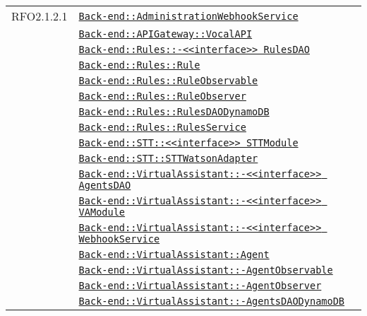 \begin{longtable}{|>{\centering}m{3cm}|m{10cm}<{\centering}|}
RFO2.1.2.1 & \hyperref[Back-end::AdministrationWebhookService]{\texttt{Back-end::AdministrationWebhookService}}\\
& \hyperref[Back-end::APIGateway::VocalAPI]{\texttt{Back-end::APIGateway::VocalAPI}}\\
& \hyperref[Back-end::Rules::<<interface>> RulesDAO]{\texttt{Back-end::Rules::-\linebreak <<interface>> RulesDAO}}\\
& \hyperref[Back-end::Rules::Rule]{\texttt{Back-end::Rules::Rule}}\\
& \hyperref[Back-end::Rules::RuleObservable]{\texttt{Back-end::Rules::RuleObservable}}\\
& \hyperref[Back-end::Rules::RuleObserver]{\texttt{Back-end::Rules::RuleObserver}}\\
& \hyperref[Back-end::Rules::RulesDAODynamoDB]{\texttt{Back-end::Rules::RulesDAODynamoDB}}\\
& \hyperref[Back-end::Rules::RulesService]{\texttt{Back-end::Rules::RulesService}}\\
& \hyperref[Back-end::STT::<<interface>> STTModule]{\texttt{Back-end::STT::<<interface>> STTModule}}\\
& \hyperref[Back-end::STT::STTWatsonAdapter]{\texttt{Back-end::STT::STTWatsonAdapter}}\\
& \hyperref[Back-end::VirtualAssistant::<<interface>> AgentsDAO]{\texttt{Back-end::VirtualAssistant::-\linebreak <<interface>> AgentsDAO}}\\
& \hyperref[Back-end::VirtualAssistant::<<interface>> VAModule]{\texttt{Back-end::VirtualAssistant::-\linebreak <<interface>> VAModule}}\\
& \hyperref[Back-end::VirtualAssistant::<<interface>> WebhookService]{\texttt{Back-end::VirtualAssistant::-\linebreak <<interface>> WebhookService}}\\
& \hyperref[Back-end::VirtualAssistant::Agent]{\texttt{Back-end::VirtualAssistant::Agent}}\\
& \hyperref[Back-end::VirtualAssistant::AgentObservable]{\texttt{Back-end::VirtualAssistant::-\linebreak AgentObservable}}\\
& \hyperref[Back-end::VirtualAssistant::AgentObserver]{\texttt{Back-end::VirtualAssistant::-\linebreak AgentObserver}}\\
& \hyperref[Back-end::VirtualAssistant::AgentsDAODynamoDB]{\texttt{Back-end::VirtualAssistant::-\linebreak AgentsDAODynamoDB}}\\

\end{longtable}
